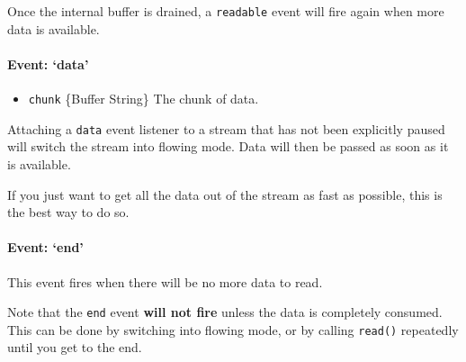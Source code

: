 Once the internal buffer is drained, a \texttt{readable} event will fire
again when more data is available.

\paragraph{Event: `data'}\label{event-data}

\begin{itemize}
\itemsep1pt\parskip0pt
\item
  \texttt{chunk} \{Buffer \textbar{} String\} The chunk of data.
\end{itemize}

Attaching a \texttt{data} event listener to a stream that has not been
explicitly paused will switch the stream into flowing mode. Data will
then be passed as soon as it is available.

If you just want to get all the data out of the stream as fast as
possible, this is the best way to do so.

\begin{Shaded}
\end{Shaded}

\paragraph{Event: `end'}\label{event-end}

This event fires when there will be no more data to read.

Note that the \texttt{end} event \textbf{will not fire} unless the data
is completely consumed. This can be done by switching into flowing mode,
or by calling \texttt{read()} repeatedly until you get to the end.

\begin{Shaded}
\end{Shaded}

